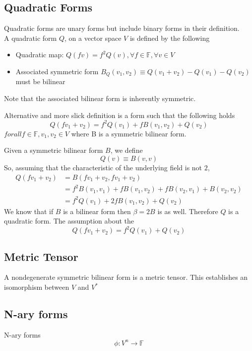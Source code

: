 \documentclass[a4paper]{scrartcl}
\begin{document}
\subsection{Quadratic Forms}
Quadratic forms are unary forms but include binary forms in their definition. \\
A quadratic form $Q$, on a vector space $V$ is defined by the following
\begin{itemize}
\item {Quadratic map: $Q(fv) = f^2 Q(v), \forall f\in\mathbb{F}, \forall v\in V$}
\item {Associated symmetric form $B_{Q}(v_{1}, v_{2}) \equiv 
Q(v_{1} + v_{2}) - Q(v_{1}) - Q(v_{2})$ must be bilinear}
\end{itemize}
Note that the associated bilinear form is inherently symmetric.

Alternative and more slick definition is a form such that the following holds
$$Q(fv_{1} + v_{2}) = f^2 Q(v_{1}) + f B(v_{1}, v_{2}) + Q(v_{2})$$
$forall f\in\mathbb{F}, v_{1},v_{2}\in V$ where B is a symmetric bilinear form.

Given a symmetric bilinear form $B$, we define 
$$Q(v) \equiv B(v,v)$$
So, assuming that the characteristic of the underlying field is not $2$,
\begin{align*}
Q(fv_{1} + v_{2}) &= B(fv_{1} + v_{2}, fv_{1} + v_{2}) \\
&= f^2 B(v_{1}, v_{1}) + f B(v_{1}, v_{2}) + f B(v_{2}, v_{1}) + B(v_{2}, v_{2}) \\
&= f^2 Q(v_{1}) + 2 f B(v_{1}, v_{2}) + Q(v_{2})
\end{align*}
We know that if $B$ is a bilinear form then $\beta = 2B$ is as well. Therefore $Q$ is a quadratic form. 
The assumption about the 
$$Q(fv_{1} + v_{2}) = f^2 Q(v_{1})  + Q(v_{2})$$

\subsection{Metric Tensor}
A nondegenerate symmetric bilinear form is a metric tensor. This establishes an isomorphism between $V$ and $V^{\ast}$






\subsection{N-ary forms}
N-ary forms 
$$\phi\colon V^{n} \rightarrow \mathbb{F}$$
\end{document}
